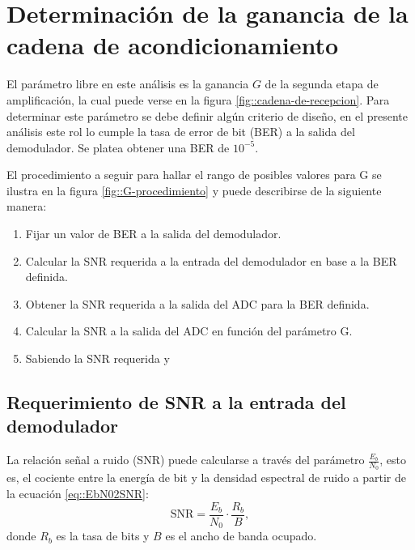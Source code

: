 \documentclass[../../main.tex]{subfiles}
\begin{document}


\section{Determinación de la ganancia de la cadena de acondicionamiento}
El parámetro libre en este análisis es la ganancia $G$ de la segunda etapa de amplificación, la cual puede verse en la figura \ref{fig::cadena-de-recepcion}. Para determinar este parámetro se debe definir algún criterio de diseño, en el presente análisis este rol lo cumple la tasa de error de bit (BER) a la salida del demodulador. Se platea obtener una BER de $10^{-5}$.

El procedimiento a seguir para hallar el rango de posibles valores para G se ilustra en la figura \ref{fig::G-procedimiento} y puede describirse de la siguiente manera:
\begin{enumerate}
    \item Fijar un valor de BER a la salida del demodulador.
    \item Calcular la SNR requerida a la entrada del demodulador en base a la BER definida.
    \item Obtener la SNR requerida a la salida del ADC para la BER definida.
    \item Calcular la SNR a la salida del ADC en función del parámetro G.
    \item Sabiendo la SNR requerida y 
\end{enumerate}


\subsection{Requerimiento de SNR a la entrada del demodulador}
La relación señal a ruido (SNR) puede calcularse a través del parámetro $\frac{E_b}{N_0}$, esto es, el cociente entre la energía de bit y la densidad espectral de ruido a partir de la ecuación \ref{eq::EbN02SNR}:
\begin{equation}
    \textrm{SNR} = \frac{E_b}{N_0} \cdot \frac{R_b}{B},
    \label{eq::EbN02SNR}
\end{equation}
donde $R_b$ es la tasa de bits y $B$ es el ancho de banda ocupado.
\end{document}
